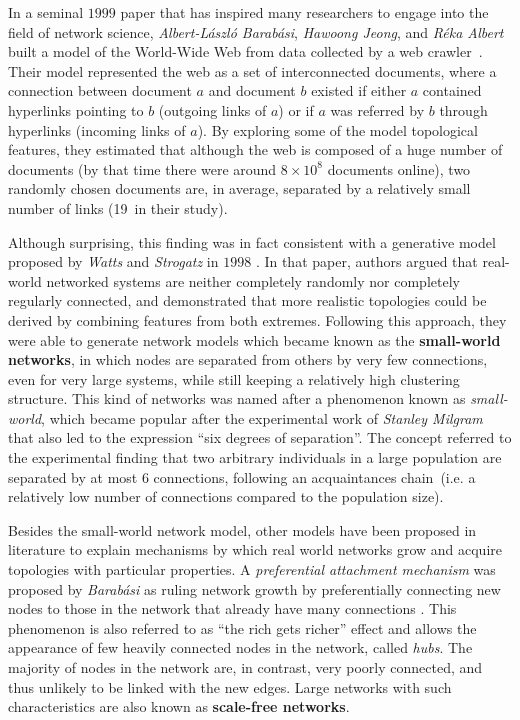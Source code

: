 In a seminal $1999$ paper that has inspired many researchers to engage into the field of network science, \textit{Albert-László Barabási}, \textit{Hawoong Jeong}, and \textit{Réka Albert} built a model of the World-Wide Web from data collected by a web crawler~\cite{Albert1999}. 
Their model represented the web as a set of interconnected documents, where a connection between document $a$ and document $b$ existed if either $a$ contained hyperlinks pointing to $b$ (outgoing links of $a$) or if $a$ was referred by $b$ through hyperlinks (incoming links of $a$).
By exploring some of the model topological features, they estimated that although the web is composed of a huge number of documents (by that time there were around $8 \times 10^8$ documents online), two randomly chosen documents are, in average, separated by a relatively small number of links (19~in their study). 

Although surprising, this finding was in fact consistent with a generative model proposed by \textit{Watts} and \textit{Strogatz} in $1998$ \cite{Watts1998}.
In that paper, authors argued that real-world networked systems are neither completely randomly nor completely regularly connected, and demonstrated that more realistic topologies could be derived by combining features from both extremes.
Following this approach, they were able to generate network models which became known as the \textbf{small-world networks}, in which nodes are separated from others by very few connections, even for very large systems, while still keeping a relatively high clustering structure.
This kind of networks was named after a phenomenon known as \textit{small-world}, which became popular after the experimental work of \textit{Stanley Milgram} \cite{Milgram1969} that also led to the expression ``six degrees of separation''.
The concept referred to the experimental finding that two arbitrary individuals in a large population are separated by at most 6 connections, following an acquaintances chain~(i.e. a relatively low number of connections compared to the population size).

Besides the small-world network model, other models have been proposed in literature to explain mechanisms by which real world networks grow and acquire topologies with particular properties.
A \textit{preferential attachment mechanism} was proposed by \textit{Barabási} as ruling network growth by preferentially connecting new nodes to those in the network that already have many connections \cite{Barabasi1999a}.
This phenomenon is also referred to as ``the rich gets richer'' effect and allows the appearance of few heavily connected nodes in the network, called \textit{hubs}. 
The majority of nodes in the network are, in contrast, very poorly connected, and thus unlikely to be linked with the new edges.
Large networks with such characteristics are also known as \textbf{scale-free networks}.

